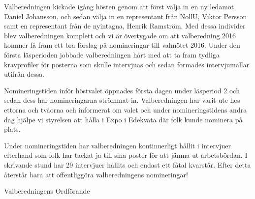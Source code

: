 \documentclass[../_main/handlingar.tex]{subfiles}
\begin{document}

Valberedningen kickade igång hösten genom att först välja in en ny ledamot, Daniel Johansson, och sedan välja in en representant från NollU, Viktor Persson samt en representant från de nyintagna, Henrik Ramström. Med dessa individer blev valberedningen komplett och vi är övertygade om att valberedning 2016 kommer få fram ett bra förslag på nomineringar till valmötet 2016.
Under den första läsperioden jobbade valberedningen hårt med att ta fram tydliga kravprofiler för posterna som skulle intervjuas och sedan formades intervjumallar utifrån dessa.

Nomineringstiden inför höstvalet öppnades första dagen under läsperiod 2 och sedan dess har nomineringarna strömmat in. Valberedningen har varit ute hos ettorna och tvåorna och informerat om valet och under nomineringstidens andra dag hjälpe vi styrelsen att hålla i Expo i Edekvata där folk kunde nominera på plats.

Under nomineringstiden har valberedningen kontinuerligt hållit i intervjuer efterhand som folk har tackat ja till sina poster för att jämna ut arbetsbördan. I skrivande stund har 29 intervjuer hållits och endast ett fåtal kvarstår. Efter detta återstår bara att offentliggöra valberedningens nomineringar!

\begin{signatures}{1}
    \mvh
    \signature{Elin Magnusson}{Valberedningens Ordförande}
\end{signatures}
\end{document}
